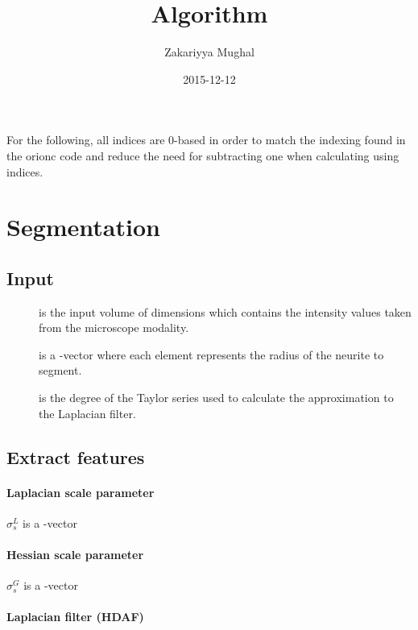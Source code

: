 \documentclass[12pt]{article}
\title{Algorithm}
\author{Zakariyya Mughal}
\date{2015-12-12}
\begin{document}
\maketitle
\tableofcontents

For the following, all indices are 0-based in order to match the
indexing found in the \gls{orionc} code and reduce the need for
subtracting one when calculating using indices.

\section{Segmentation}

\subsection{Input}

\begin{description}
	\item[\InputVolume{}] is the input volume of dimensions
		\InputVolumeDimensions{} which contains the intensity values taken
		from the microscope modality.
	\item[\RadiiScales{}] is a \Dim{\RadiiScalesName}-vector where each element
		represents the radius of the neurite to segment.
	\item[\LaplacianFilterApproxDegree{}] is the degree of the
		Taylor series used to calculate the approximation
		to the Laplacian filter.
\end{description}

\subsection{Extract features}

\paragraph{Laplacian scale parameter}

\(\sigma^{L}_{s}\) is a \Dim{\RadiiScalesName}-vector

\paragraph{Hessian scale parameter}

\(\sigma^{G}_{s}\) is a \Dim{\RadiiScalesName}-vector

\paragraph{Laplacian filter (HDAF)}
\end{document}
